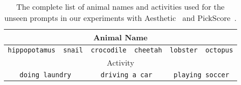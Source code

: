 \setlength{\tabcolsep}{17pt}
\renewcommand{\arraystretch}{2.0} 
\begin{table*}[ht]
\begin{center}
\caption{The complete list of animal names and activities used for the unseen prompts in our experiments with Aesthetic~\cite{aesthetic} and PickScore~\cite{pickscore}.}
\label{table:unseen_prompt}
\begin{tabular}{cccccc}
\hline
\multicolumn{6}{c}{Animal Name} \\ \hline
\multicolumn{1}{c|}{\texttt{hippopotamus}} & \multicolumn{1}{c|}{\texttt{snail}} & \multicolumn{1}{c|}{\texttt{crocodile}} & \multicolumn{1}{c|}{\texttt{cheetah}} & \multicolumn{1}{c|}{\texttt{lobster}} & \texttt{octopus} \\ \hline
\multicolumn{6}{c}{Activity} \\ \hline
\multicolumn{2}{c|}{\texttt{doing laundry}} & \multicolumn{2}{c|}{\texttt{driving a car}} & \multicolumn{2}{c}{\texttt{playing soccer}}    
\end{tabular}

\end{center}
\end{table*}